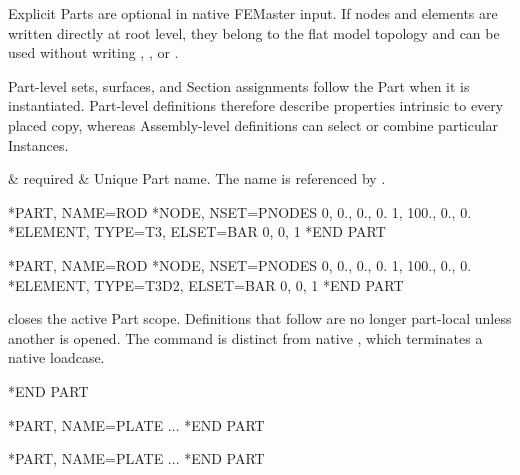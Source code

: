 Explicit Parts are optional in native FEMaster input. If nodes and elements are written directly at root level, they belong to the flat model topology and can be used without writing , , or .

Part-level sets, surfaces, and Section assignments follow the Part when it is instantiated. Part-level definitions therefore describe properties intrinsic to every placed copy, whereas Assembly-level definitions can select or combine particular Instances.

\begin{keywordparameters}
 & required & Unique Part name. The name is referenced by . \\
\end{keywordparameters}

\exampleheading

\begin{dialectexamples}
\begin{femasterdeck}
*PART, NAME=ROD
*NODE, NSET=PNODES
0,   0., 0., 0.
1, 100., 0., 0.
*ELEMENT, TYPE=T3, ELSET=BAR
0, 0, 1
*END PART
\end{femasterdeck}
\begin{abaqusdeck}
*PART, NAME=ROD
*NODE, NSET=PNODES
0,   0., 0., 0.
1, 100., 0., 0.
*ELEMENT, TYPE=T3D2, ELSET=BAR
0, 0, 1
*END PART
\end{abaqusdeck}
\end{dialectexamples}


 closes the active Part scope. Definitions that follow are no longer part-local unless another  is opened. The command is distinct from native , which terminates a native loadcase.

\syntaxheading

\begin{syntax}
*END PART
\end{syntax}

\exampleheading

\begin{dialectexamples}
\begin{femasterdeck}
*PART, NAME=PLATE
...
*END PART
\end{femasterdeck}
\begin{abaqusdeck}
*PART, NAME=PLATE
...
*END PART
\end{abaqusdeck}
\end{dialectexamples}

